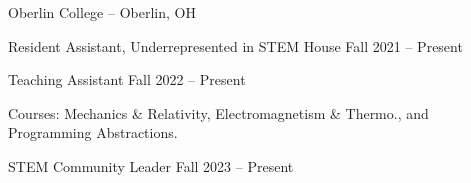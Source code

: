 \begin{entry}{Oberlin College -- Oberlin, OH}



	\entryItem
		{Resident Assistant, Underrepresented in STEM House}
		{Fall 2021 -- Present}

	\entryItem
		{Teaching Assistant}
		{Fall 2022 -- Present}

		\begin{items}
			\item Courses: Mechanics \& Relativity, Electromagnetism \& Thermo., and Programming Abstractions.
		\end{items}

	\entryItem
		{STEM Community Leader}
		{Fall 2023 -- Present}
	
\end{entry}

